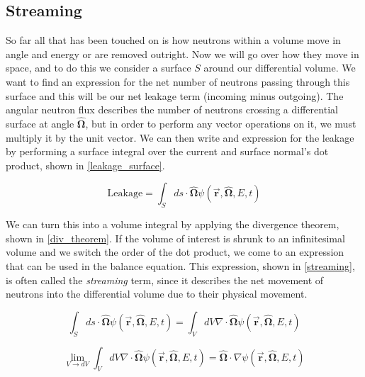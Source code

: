 \subsection{Streaming}

So far all that has been  touched on is how neutrons within a volume move in angle and energy or are removed outright.  Now we will go over how they move in space, and to do this we consider a surface $S$ around our differential volume.  We want to find an expression for the net number of neutrons passing through this surface and this will be our net leakage term (incoming minus outgoing).  The angular neutron flux describes the number of neutrons crossing a differential surface at angle $\boldsymbol{\hat{\Omega}}$, but in order to perform any vector operations on it, we must multiply it by the unit vector.  We can then write and expression for the leakage by performing a surface integral over the current and surface normal's dot product, shown in \eqref{leakage_surface}.

\begin{equation}
\label{leakage_surface}
\mathrm{Leakage} = \int_S ds \cdot \boldsymbol{\hat{\Omega}} \psi(\boldsymbol{\vec{r}},\boldsymbol{\hat{\Omega}},E,t)
\end{equation}
 
 We can turn this into a volume integral by applying the divergence theorem, shown in \eqref{div_theorem}.  If the volume of interest is shrunk to an infinitesimal volume and we switch the order of the dot product, we come to an expression that can be used in the balance equation.  This expression, shown in \eqref{streaming}, is often called the \emph{streaming} term, since it describes the net movement of neutrons into the differential volume due to their physical movement.
 
\begin{equation}
\label{div_theorem}
\int_S ds \cdot \boldsymbol{\hat{\Omega}} \psi(\boldsymbol{\vec{r}},\boldsymbol{\hat{\Omega}},E,t) = \int_V dV \nabla \cdot \boldsymbol{\hat{\Omega}}  \psi(\boldsymbol{\vec{r}},\boldsymbol{\hat{\Omega}},E,t)
\end{equation}

\begin{equation}
\label{streaming}
 \lim_{V\to dV} \int_V dV \nabla \cdot \boldsymbol{\hat{\Omega}}  \psi(\boldsymbol{\vec{r}},\boldsymbol{\hat{\Omega}},E,t) =  \boldsymbol{\hat{\Omega}}  \cdot \nabla\psi(\boldsymbol{\vec{r}},\boldsymbol{\hat{\Omega}},E,t) 
 \end{equation}
 

